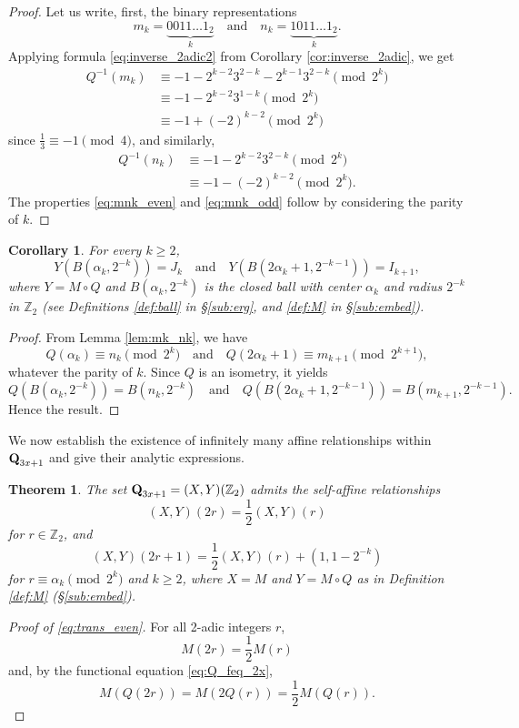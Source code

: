 \documentclass[12pt]{article}
\newtheorem{theorem}{Theorem}
\newtheorem{corollary}{Corollary}
\theoremstyle{definition}
\newcommand{\Qset}{\normalfont \textbf{Q}_{3x+1}}
\begin{document}
{{\begin{proof}
Let us write, first, the binary representations 
$$ m_k = \underbrace{0011\ldots1_{2}}_{k} \quad \text{and} \quad n_k = \underbrace{1011\ldots1_{2}}_{k}.$$ 
Applying formula \eqref{eq:inverse_2adic2} from Corollary \ref{cor:inverse_2adic}, we get
\begin{align*}
Q^{-1}(m_k) & \equiv -1 - 2^{k-2}3^{2-k} - 2^{k-1}3^{2-k} \pmod{2^k}\\
& \equiv -1 - 2^{k-2}3^{1-k} \pmod{2^k} \\
& \equiv -1 + (-2)^{k-2} \pmod{2^k}
\end{align*}
since $\frac13 \equiv -1 \pmod{4}$, and similarly,
\begin{align*}
Q^{-1}(n_k) & \equiv -1 - 2^{k-2}3^{2-k} \pmod{2^k} \\
& \equiv -1 - (-2)^{k-2} \pmod{2^k}.
\end{align*}
The properties \eqref{eq:mnk_even} and \eqref{eq:mnk_odd} follow by considering the parity of $k$.
\end{proof}

\begin{corollary}\label{cor:ball_to_interval}
For every $k \geq 2$,
$$ Y\left( B(\alpha_k,2^{-k})\right) = J_k \quad \text{and} \quad Y\left( B(2\alpha_k+1,2^{-k-1})\right) = I_{k+1},$$
where $Y=M \circ Q$ and $B(\alpha_k,2^{-k})$ is the closed ball with center $\alpha_k$ and radius $2^{-k}$ in $\mathbb Z_{2}$ (see Definitions  \ref{def:ball} in \S\ref{sub:erg}, and \ref{def:M} in \S\ref{sub:embed}).
\end{corollary}

\begin{proof}
From Lemma \ref{lem:mk_nk}, we have
$$ Q(\alpha_k) \equiv n_k \pmod{2^k} \quad \text{and} \quad Q(2 \alpha_k + 1) \equiv m_{k+1} \pmod{2^{k+1}},$$
whatever the parity of $k$. Since $Q$ is an isometry, it yields
$$Q(B(\alpha_k,2^{-k})) = B(n_k,2^{-k}) \quad \text{and} \quad  Q(B(2 \alpha_k + 1,2^{-k-1})) = B(m_{k+1},2^{-k-1}).$$
Hence the result.
\end{proof}

We now establish the existence of infinitely many affine relationships within $\Qset$ and give their analytic expressions.
\begin{theorem} \label{th:autosim}
The set $\Qset = (X,Y)(\mathbb Z_2)$ admits the self-affine relationships
\begin{equation} \label{eq:trans_even}
( X, Y )(2r) = \frac12 ( X, Y)(r) 
\end{equation}
for $r \in \mathbb Z_{2}$, and
\begin{equation} \label{eq:trans_odd}
( X, Y )(2r+1) = \frac12 ( X, Y)(r) + ( 1 , 1-2^{-k} )
\end{equation}
for $r \equiv \alpha_k \pmod{2^k}$ and $k \geq 2$, where $X=M$ and $Y=M \circ Q$ as in Definition \ref{def:M} (\S\ref{sub:embed}).
\end{theorem}
\begin{proof}[Proof of \eqref{eq:trans_even}]
For all 2-adic integers $r$, $$M(2r) = \frac12 M(r)$$ and, by the functional equation \eqref{eq:Q_feq_2x}, $$M(Q(2r)) = M(2Q(r)) = \frac12 M(Q(r)).$$
\end{proof}

}}
\end{document}
